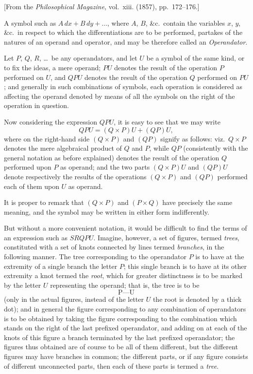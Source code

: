 \documentclass[11pt,a4paper]{article}
\theoremstyle{plain}
\begin{document}
[From the \textit{Philosophical Magazine}, vol.~xiii. (1857), pp.~172--176.]
\vspace{1em}

A symbol such as $A\,dx + B\,dy + \ldots$, where $A$, $B$, \&c.\ contain the variables $x$, $y$, \&c.\ in respect to which the differentiations are to be performed, partakes of the natures of an operand and operator, and may be therefore called an \textit{Operandator}.

Let $P$, $Q$, $R$, \ldots\ be any operandators, and let $U$ be a symbol of the same kind, or to fix the ideas, a mere operand; $PU$ denotes the result of the operation $P$ performed on $U$, and $QPU$ denotes the result of the operation $Q$ performed on $PU$; and generally in such combinations of symbols, each operation is considered as affecting the operand denoted by means of all the symbols on the right of the operation in question.

Now considering the expression $QPU$, it is easy to see that we may write
\[
QPU = (Q \times P)U + (QP)U,
\]
where on the right-hand side $(Q \times P)$ and $(QP)$ signify as follows: viz.\ $Q \times P$ denotes the mere algebraical product of $Q$ and $P$, while $QP$ (consistently with the general notation as before explained) denotes the result of the operation $Q$ performed upon $P$ as operand; and the two parts $(Q \times P)U$ and $(QP)U$ denote respectively the results of the operations $(Q \times P)$ and $(QP)$ performed each of them upon $U$ as operand.

It is proper to remark that $(Q \times P)$ and $(P \times Q)$ have precisely the same meaning, and the symbol may be written in either form indifferently.

But without a more convenient notation, it would be difficult to find the terms of an expression such as $SRQPU$. Imagine, however, a set of figures, termed \textit{trees}, constituted with a set of knots connected by lines termed \textit{branches}, in the following manner. The tree corresponding to the operandator $P$ is to have at the extremity of a single branch the letter $P$; this single branch is to have at its other extremity a knot termed the \textit{root}, which for greater distinctness is to be marked by the letter $U$ representing the operand; that is, the tree is to be
\[
\text{P---U}
\]
(only in the actual figures, instead of the letter $U$ the root is denoted by a thick dot); and in general the figure corresponding to any combination of operandators is to be obtained by taking the figure corresponding to the combination which stands on the right of the last prefixed operandator, and adding on at each of the knots of this figure a branch terminated by the last prefixed operandator; the figures thus obtained are of course to be all of them different, but the different figures may have branches in common; the different parts, or if any figure consists of different unconnected parts, then each of these parts is termed a \textit{tree}.
\end{document}
